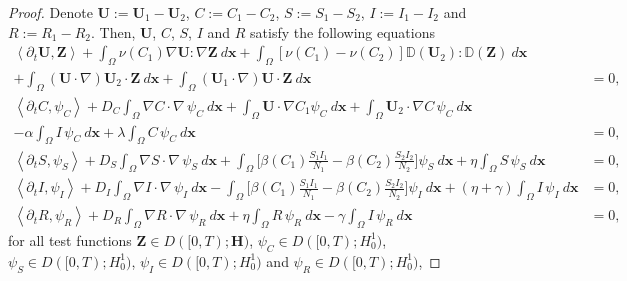 \documentclass[10pt,a4paper]{amsart}
\begin{document}
\begin{proof}
		\noindent
{Denote $\boldsymbol{U}:= \boldsymbol{U}_1 - \boldsymbol{U}_2$,  $C:= C_1 - C_2$, $S:= S_1 - S_2$, $I:= I_1 - I_2$ and $R:= R_1 - R_2$.   
		 Then, $\boldsymbol{U}$, $C$, $S$, $I$ and  $R$ satisfy the following equations}
		\begin{eqnarray}
			\left\langle\partial_{t}\boldsymbol{U}, \boldsymbol{Z}\right\rangle+ \int_{\Omega} \nu(C_1) \nabla \boldsymbol{U}: \nabla \boldsymbol{Z}~d{\mathbf{x}}+\int_{\Omega}\left[\nu(C_1)-\nu\left(C_{2}\right)\right] \mathbb{D}(\boldsymbol{U}_{2}): \mathbb{D}(\boldsymbol{Z}) ~d{\mathbf{x}}&
			\nonumber\\
			+\int_{\Omega}( \boldsymbol{U}\cdot \nabla) \boldsymbol{U}_{2}\cdot \boldsymbol{Z}~d{\mathbf{x}}+\int_{\Omega}( \boldsymbol{U}_1\cdot \nabla) \boldsymbol{U}\cdot \boldsymbol{Z}~d{\mathbf{x}}
			&=0, \;\;\label{uni1} \\  
			\left\langle\partial_tC, \psi_C\right\rangle+D_C\int_{\Omega}\nabla C\cdot\nabla\, \psi_C~d{\mathbf{x}}+\int_{\Omega}\boldsymbol{U}\cdot\nabla C_1 \psi_C~d{\mathbf{x}}+\int_{\Omega} \boldsymbol{U}_{2} \cdot\nabla C\, \psi_C~d{\mathbf{x}}
			&
			\nonumber\\
			-\alpha\int_{\Omega} I\, \psi_C~d{\mathbf{x}}+\lambda\int_{\Omega} C\, \psi_C~d{\mathbf{x}}
			&=0,\label{uni2} \\ 
			\left\langle\partial_tS, \psi_S\right\rangle+D_S\int_{\Omega}\nabla S\cdot\nabla\, \psi_S ~d{\mathbf{x}}+\int_{\Omega}\Big[\beta(C_1)\frac{S_1 I_1}{N_1}-\beta(C_2)\frac{S_2 I_2}{N_2}\Big]\psi_S~d{\mathbf{x}}
			+\eta\int_{\Omega} S\, \psi_S~d{\mathbf{x}}&= 0, \;\;\label{uni3}
			\\ 
			\left\langle\partial_t I, \psi_I\right\rangle+D_I\int_{\Omega}\nabla I\cdot\nabla\, \psi_I ~d{\mathbf{x}}-\int_{\Omega}\Big[\beta(C_1)\frac{S_1 I_1}{N_1}-\beta(C_2)\frac{S_2 I_2}{N_2}\Big]\psi_I~d{\mathbf{x}}
			+(\eta+\gamma)\int_{\Omega} I\, \psi_I~d{\mathbf{x}}&= 0, \;\;\label{uni4}
			\\ 
			\left\langle\partial_tR, \psi_R\right\rangle+D_R\int_{\Omega}\nabla R\cdot\nabla\, \psi_R ~d{\mathbf{x}}
			+\eta\int_{\Omega} R\, \psi_R~d{\mathbf{x}}-\gamma\int_{\Omega} I\, \psi_R~d{\mathbf{x}}&= 0, \;\;\label{uni5}
		\end{eqnarray} 
		for all test functions  
		$\boldsymbol{Z} \in D([0,T); \mathbf{H})$, $\psi_C \in D([0,T);  H^1_0)$, $\psi_S \in D([0,T);  H^1_0)$, $\psi_I \in D([0,T);  H^1_0)$ 
		and $\psi_R \in D([0,T);  H^1_0)$,  

\end{proof}
\end{document}
